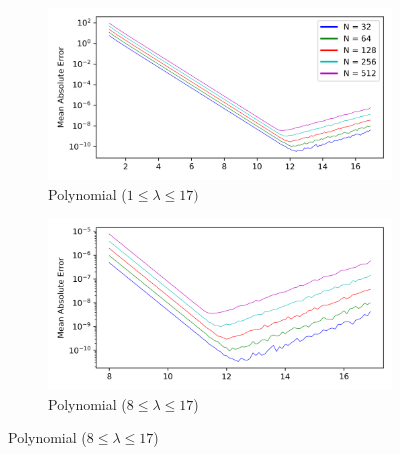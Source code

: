 \documentclass[a4paper]{report}
\begin{document}
\begin{figure}[H]
    \begin{subfigure}{.5\linewidth}
      \includegraphics[width=\linewidth]{images/abate_whitt/polynomial.png}
      \caption{Polynomial ($1 \leq \lambda \leq 17)$}
    \end{subfigure}\hfill
    \begin{subfigure}{.5\linewidth}
      \includegraphics[width=\linewidth]{images/abate_whitt/polynomial_zoomed.png}
      \caption{Polynomial ($8 \leq \lambda \leq 17$)}
    \end{subfigure}
    
    \medskip
    

\end{figure}
\end{document}
